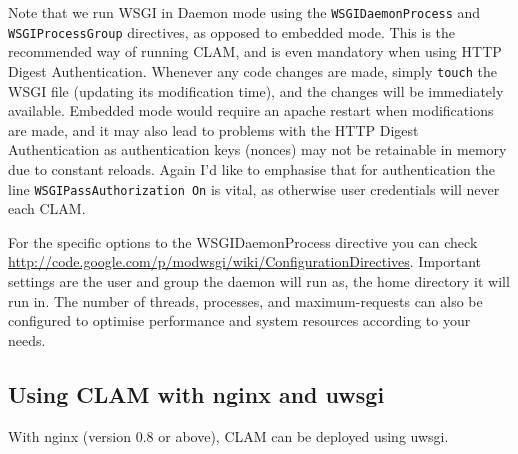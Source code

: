 \documentclass[a4paper,12pt,twoside,openright]{report}
\begin{document}
Note that we run WSGI in Daemon mode using the \texttt{WSGIDaemonProcess} and
\texttt{WSGIProcessGroup} directives, as opposed to embedded mode. This is the
recommended way of running CLAM, and is even mandatory when using HTTP Digest
Authentication. Whenever any code changes are made, simply
\texttt{touch} the WSGI file (updating its modification time), and the changes
will be immediately available. Embedded mode would require an apache restart
when modifications are made, and it may also lead to problems with the HTTP
Digest Authentication as authentication keys (nonces) may not be retainable in
memory due to constant reloads.  Again I'd like to emphasise that for
authentication the line \texttt{WSGIPassAuthorization On} is vital, as
otherwise user credentials will never each CLAM.

For the specific options to the WSGIDaemonProcess directive you can check
\url{http://code.google.com/p/modwsgi/wiki/ConfigurationDirectives}.
Important settings are the user and group the daemon will run as, the home
directory it will run in. The number of threads, processes, and
maximum-requests can also be configured to optimise performance and system
resources according to your needs.

\subsection{Using CLAM with nginx and uwsgi}
\label{sec:uwsginginx}

With nginx (version 0.8 or above), CLAM can be deployed using uwsgi.
\end{document}
